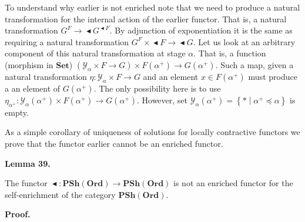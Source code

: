 \documentclass[10pt,a4paper]{article}
\begin{document}
 
 
To understand why earlier is not enriched note that we need to produce a natural transformation for the internal action of the earlier functor. That is, a natural transformation $G^{F}\to\mathop{\blacktriangleleft}G^{\mathop{\blacktriangleleft}F}$. By adjunction of exponentiation it is the same as requiring a natural transformation $G^{F}\times{\mathop{\blacktriangleleft}F}\to\mathop{\blacktriangleleft}G$. Let us look at an arbitrary component of this natural transformation at stage $\alpha$. That is, a function (morphism in $\mathbf{Set}$) $(\mathcal{Y}_{\alpha}\times F\to G)\times F({\alpha}^{+})\to G({\alpha}^{+})$. Such a map, given a natural transformation $\eta:\mathcal{Y}_{\alpha}\times F\to G$ and an element $x\in F({\alpha}^{+})$ must produce a an element of $G({\alpha}^{+})$. The only possibility here is to use $\eta_{{\alpha}^{+}}:\mathcal{Y}_{\alpha}({\alpha}^{+})\times F({\alpha}^{+})\to G({\alpha}^{+})$. However, set $\mathcal{Y}_{\alpha}({\alpha}^{+})=\left\{*\middle|{\alpha}^{+}\preceq\alpha\right\}$ is empty.\par
 
 
 
 
As a simple corollary of uniqueness of solutions for locally contractive functors we prove that the functor earlier cannot be an enriched functor.\par
 
 
 
\par\medskip\noindent\textbf{Lemma 39.}\par
 
 
The functor $\mathop{\blacktriangleleft}:\mathbf{PSh}(\mathbf{Ord})\to\mathbf{PSh}(\mathbf{Ord})$ is not an enriched functor for the self-enrichment of the category $\mathbf{PSh}(\mathbf{Ord})$.\par
 
 
 
 
\par\medskip\noindent\textbf{Proof.}\par
 
\end{document}
